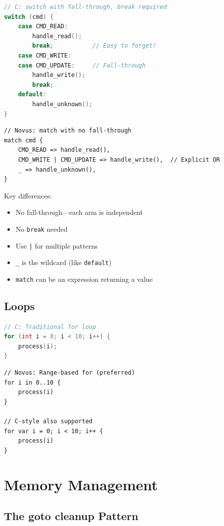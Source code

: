 \begin{lstlisting}[language=C]
// C: switch with fall-through, break required
switch (cmd) {
    case CMD_READ:
        handle_read();
        break;           // Easy to forget!
    case CMD_WRITE:
    case CMD_UPDATE:     // Fall-through
        handle_write();
        break;
    default:
        handle_unknown();
}
\end{lstlisting}

\begin{lstlisting}
// Novus: match with no fall-through
match cmd {
    CMD_READ => handle_read(),
    CMD_WRITE | CMD_UPDATE => handle_write(),  // Explicit OR
    _ => handle_unknown(),
}
\end{lstlisting}

Key differences:
\begin{itemize}
    \item No fall-through---each arm is independent
    \item No \texttt{break} needed
    \item Use \texttt{|} for multiple patterns
    \item \texttt{\_} is the wildcard (like \texttt{default})
    \item \texttt{match} can be an expression returning a value
\end{itemize}

\subsection{Loops}

\begin{lstlisting}[language=C]
// C: Traditional for loop
for (int i = 0; i < 10; i++) {
    process(i);
}
\end{lstlisting}

\begin{lstlisting}
// Novus: Range-based for (preferred)
for i in 0..10 {
    process(i)
}

// C-style also supported
for var i = 0; i < 10; i++ {
    process(i)
}
\end{lstlisting}

\section{Memory Management}

\subsection{The goto cleanup Pattern}

